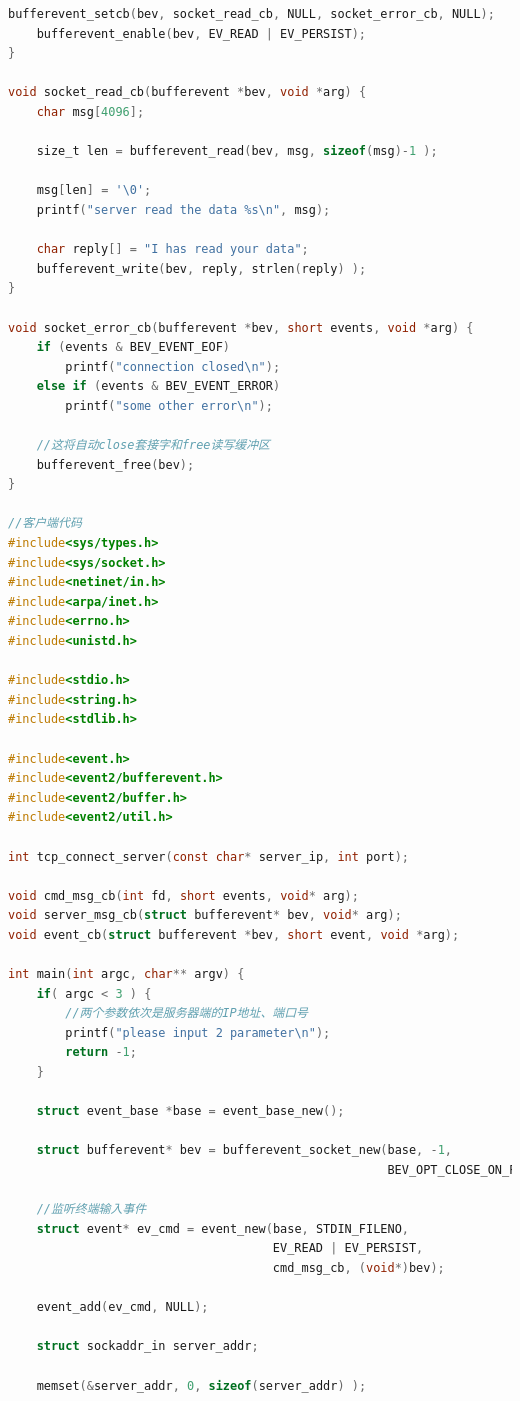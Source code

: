 \documentclass[11pt,a4paper]{article}
\begin{document}
\begin{lstlisting}[language=C]
    bufferevent_setcb(bev, socket_read_cb, NULL, socket_error_cb, NULL);
    bufferevent_enable(bev, EV_READ | EV_PERSIST);
}

void socket_read_cb(bufferevent *bev, void *arg) {
    char msg[4096];

    size_t len = bufferevent_read(bev, msg, sizeof(msg)-1 );

    msg[len] = '\0';
    printf("server read the data %s\n", msg);

    char reply[] = "I has read your data";
    bufferevent_write(bev, reply, strlen(reply) );
}

void socket_error_cb(bufferevent *bev, short events, void *arg) {
    if (events & BEV_EVENT_EOF)
        printf("connection closed\n");
    else if (events & BEV_EVENT_ERROR)
        printf("some other error\n");

    //这将自动close套接字和free读写缓冲区
    bufferevent_free(bev);
}

//客户端代码
#include<sys/types.h>
#include<sys/socket.h>
#include<netinet/in.h>
#include<arpa/inet.h>
#include<errno.h>
#include<unistd.h>

#include<stdio.h>
#include<string.h>
#include<stdlib.h>

#include<event.h>
#include<event2/bufferevent.h>
#include<event2/buffer.h>
#include<event2/util.h>

int tcp_connect_server(const char* server_ip, int port);

void cmd_msg_cb(int fd, short events, void* arg);
void server_msg_cb(struct bufferevent* bev, void* arg);
void event_cb(struct bufferevent *bev, short event, void *arg);

int main(int argc, char** argv) {
    if( argc < 3 ) {
        //两个参数依次是服务器端的IP地址、端口号
        printf("please input 2 parameter\n");
        return -1;
    }

    struct event_base *base = event_base_new();

    struct bufferevent* bev = bufferevent_socket_new(base, -1,
                                                     BEV_OPT_CLOSE_ON_FREE);

    //监听终端输入事件
    struct event* ev_cmd = event_new(base, STDIN_FILENO,
                                     EV_READ | EV_PERSIST,
                                     cmd_msg_cb, (void*)bev);

    event_add(ev_cmd, NULL);

    struct sockaddr_in server_addr;

    memset(&server_addr, 0, sizeof(server_addr) );


\end{lstlisting}
\end{document}
